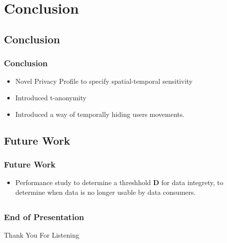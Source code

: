 \section{Conclusion}
\subsection{Conclusion} %
\begin{frame}[red] %
\frametitle{Conclusion}

\begin{itemize}\itemsep16pt
	\item Novel Privacy Profile to specify spatial-temporal sensitivity 
	\item Introduced t-anonymity
	\item Introduced a way of temporally hiding users movements.

\end{itemize}

 
\end{frame}

\subsection{Future Work} %
\begin{frame}[red] %
\frametitle{Future Work}

\begin{itemize}
	\item Performance study to determine a threshhold {\bf D} for data integrety, to determine when data is no longer usable by data consumers.

\end{itemize}
\end{frame}

\subsection{ }
\begin{frame}[red] %
\frametitle{End of Presentation}

\vspace{20mm}
\begin{center}
    \Huge Thank You For Listening
\end{center}

\end{frame}
